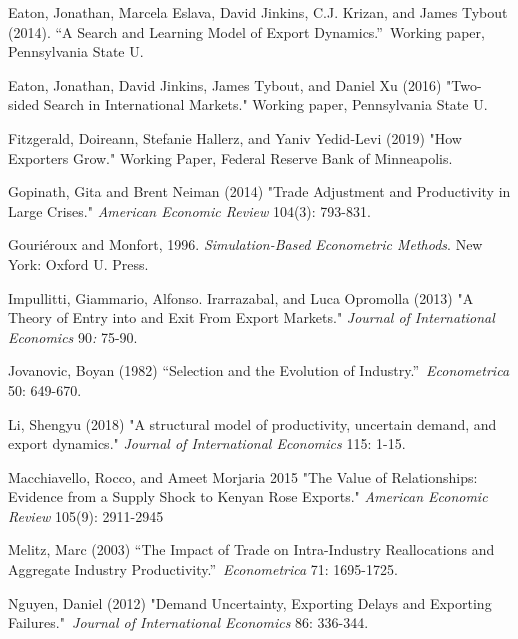 \documentclass[12pt]{article}
\begin{document}
\begin{description}
\item Eaton, Jonathan, Marcela Eslava, David Jinkins, C.J. Krizan, and James
Tybout (2014). \textquotedblleft A Search and Learning Model of Export
Dynamics.\textquotedblright\ Working paper, Pennsylvania State U.

\item Eaton, Jonathan, David Jinkins, James Tybout, and Daniel Xu (2016)
"Two-sided Search in International Markets." Working paper, Pennsylvania
State U.

\item Fitzgerald, Doireann, Stefanie Hallerz, and Yaniv Yedid-Levi (2019)
"How Exporters Grow." Working Paper, Federal Reserve Bank of Minneapolis.

\item Gopinath, Gita and Brent Neiman (2014) "Trade Adjustment and
Productivity in Large Crises." \textit{American Economic Review} 104(3):
793-831.

\item Gouri\'{e}roux and Monfort, 1996. \textit{Simulation-Based Econometric
Methods}. New York: Oxford U. Press.

\item Impullitti, Giammario, Alfonso. Irarrazabal, and Luca Opromolla (2013)
"A Theory of Entry into and Exit From Export Markets." \textit{Journal of
International Economics} 90\textit{: }75-90.

\item Jovanovic, Boyan (1982) \textquotedblleft Selection and the Evolution
of Industry.\textquotedblright\ \textit{Econometrica} 50: 649-670.

\item Li, Shengyu (2018) "A structural model of productivity, uncertain
demand, and export dynamics." \textit{Journal of International Economics}
115: 1-15.

\item Macchiavello, Rocco, and Ameet Morjaria 2015 "The Value of
Relationships: Evidence from a Supply Shock to Kenyan Rose Exports." \textit{%
American Economic Review} 105(9): 2911-2945

\item Melitz, Marc (2003) \textquotedblleft The Impact of Trade on
Intra-Industry Reallocations and Aggregate Industry
Productivity.\textquotedblright\ \textit{Econometrica }71: 1695-1725.

\item Nguyen, Daniel (2012) "Demand Uncertainty, Exporting Delays and
Exporting Failures."\textit{\ Journal of International Economics }86:
336-344.


\end{description}
\end{document}
